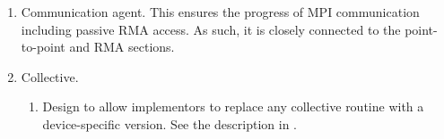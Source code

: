 \documentclass{article}
\begin{document}
\begin{enumerate}
\begin{enumerate}
  \item Communication agent. 
    This ensures the progress of MPI communication including passive RMA
    access.  As such, it is closely connected to the point-to-point and RMA
    sections.  
  \item Collective.  
    \begin{enumerate}
    \item Design to allow implementors to replace any collective routine with
      a device-specific version.  See the description in
      .
    \end{enumerate}

\end{enumerate}
\end{enumerate}
\end{document}
